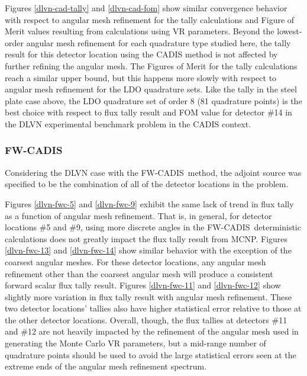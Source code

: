 \documentclass{article} %
\newcommand{\fwc}{\mbox{FW-CADIS}}
\begin{document}
Figures \ref{dlvn-cad-tally} and \ref{dlvn-cad-fom} show similar convergence
behavior with respect to angular mesh refinement for the tally calculations
and Figure of Merit values resulting from calculations using VR parameters.
Beyond the lowest-order angular mesh refinement for each quadrature type
studied here, the tally result for this detector location using the CADIS
method is not affected by further refining the angular mesh. The Figures of
Merit for the tally calculations reach a similar upper bound, but this happens
more slowly with respect to angular mesh refinement for the LDO quadrature
sets. Like the tally in the steel plate case above, the LDO quadrature set of
order 8 (81 quadrature points) is the best choice with respect to flux tally
result and FOM value for detector \#14 in the DLVN experimental benchmark
problem in the CADIS context.

\FloatBarrier
\subsubsection{\fwc}

Considering the DLVN case with the \fwc\ method, the adjoint source was
specified to be the combination of all of the detector locations in the
problem.

Figures \ref{dlvn-fwc-5} and \ref{dlvn-fwc-9} exhibit the same lack of trend in
flux tally as a function of angular mesh refinement. That is, in general, for
detector locations \#5 and \#9, using more discrete angles in the \fwc\
deterministic calculations does not greatly impact the flux tally result from
MCNP. Figures \ref{dlvn-fwc-13} and \ref{dlvn-fwc-14} show similar behavior
with the exception of the coarsest angular meshes. For these detector
locations, any angular mesh refinement other than the coarsest angular mesh
will produce a consistent forward scalar flux tally result. Figures
\ref{dlvn-fwc-11} and \ref{dlvn-fwc-12} show slightly more variation in flux
tally result with angular mesh refinement. These two detector locations'
tallies also have higher statistical error relative to those at the other
detector locations. Overall, though, the flux tallies at detectors \#11 and
\#12 are not heavily impacted by the refinement of the angular mesh used in
generating the Monte Carlo VR parameters, but a mid-range number of
quadrature points should be used to avoid the large statistical errors seen at
the extreme ends of the angular mesh refinement spectrum.
\end{document}
